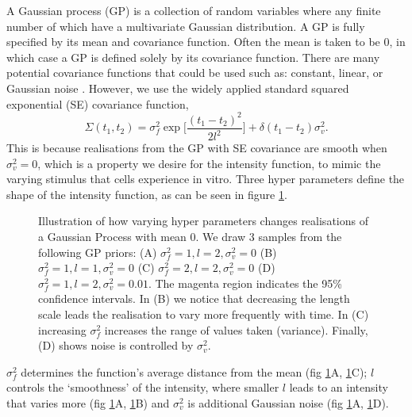 \documentclass[../main.tex]{subfiles}
\begin{document}
A Gaussian process (GP) is a collection of random variables where any finite number of which have a multivariate Gaussian distribution. A GP is fully specified by its mean and covariance function. Often the mean is taken to be 0, in which case a GP is defined solely by its covariance function.  There are many potential covariance functions that could be used such as: constant, linear, or Gaussian noise \cite{rasmussen2004}. However, we use the widely applied standard squared exponential (SE) covariance function, 
\begin{equation}\label{eq:Cov}
\Sigma(t_1,t_2) = \sigma_f^2 \exp \bigg[ \frac{(t_1 - t_2)^2}{2l^2} \bigg] + \delta (t_1 - t_2) \sigma_v^2.
\end{equation}
    This is because realisations from the GP with SE covariance are smooth when $\sigma_v^2 = 0$, which is a property we desire for the intensity function, to mimic the varying stimulus that cells experience in vitro. Three hyper parameters define the shape of the intensity function, as can be seen in figure \ref{fig:GPVary}.
  \begin{figure}[h]
   \hrulefill
   \begin{center} 
     \quad
       \vspace{0.1mm} 
   \quad
    \end{center}     
    \caption{Illustration of how varying hyper parameters changes realisations of a Gaussian Process with mean 0. We draw 3 samples from the following GP priors: (A) $\sigma_f^2 = 1, l = 2, \sigma_v^2 = 0 $ (B) $\sigma_f^2 = 1, l = 1, \sigma_v^2 = 0 $ (C) $\sigma_f^2 = 2, l = 2, \sigma_v^2 = 0 $ (D) $\sigma_f^2 = 1, l = 2, \sigma_v^2 = 0.01.$ The magenta region indicates the 95\% confidence intervals. In (B) we notice that decreasing the length scale leads the realisation to vary more frequently with time. In (C) increasing $\sigma^2_f$ increases the range of values taken (variance). Finally, (D) shows noise is controlled by $\sigma^2_v$.     }
    \label{fig:GPVary}
    \hrulefill
    \end{figure}%
      $\sigma_f^2$ determines the function's average distance from the mean (fig \ref{fig:GPVary}A, \ref{fig:GPVary}C); $l$ controls the `smoothness' of the intensity, where smaller $l$  leads to an intensity that varies more (fig \ref{fig:GPVary}A, \ref{fig:GPVary}B) and $\sigma_v^2$ is additional Gaussian noise (fig \ref{fig:GPVary}A, \ref{fig:GPVary}D). 
 
\end{document}
